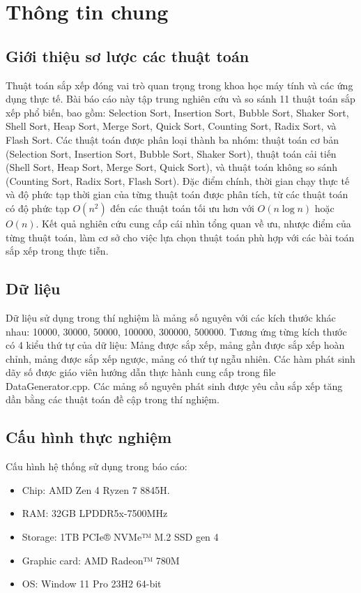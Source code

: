 \section{Thông tin chung}

\subsection{Giới thiệu sơ lược các thuật toán}

Thuật toán sắp xếp đóng vai trò quan trọng trong khoa học máy tính và các ứng dụng thực tế. Bài báo cáo này tập trung nghiên cứu và so sánh 11 thuật toán sắp xếp phổ biến, bao gồm: Selection Sort, Insertion Sort, Bubble Sort, Shaker Sort, Shell Sort, Heap Sort, Merge Sort, Quick Sort, Counting Sort, Radix Sort, và Flash Sort. Các thuật toán được phân loại thành ba nhóm: thuật toán cơ bản (Selection Sort, Insertion Sort, Bubble Sort, Shaker Sort), thuật toán cải tiến (Shell Sort, Heap Sort, Merge Sort, Quick Sort), và thuật toán không so sánh (Counting Sort, Radix Sort, Flash Sort). Đặc điểm chính, thời gian chạy thực tế và độ phức tạp thời gian của từng thuật toán được phân tích, từ các thuật toán có độ phức tạp $O(n^2)$ đến các thuật toán tối ưu hơn với $O(n \log n)$ hoặc $O(n)$. Kết quả nghiên cứu cung cấp cái nhìn tổng quan về ưu, nhược điểm của từng thuật toán, làm cơ sở cho việc lựa chọn thuật toán phù hợp với các bài toán sắp xếp trong thực tiễn.

\subsection{Dữ liệu}

Dữ liệu sử dụng trong thí nghiệm là mảng số nguyên với các kích thước khác nhau: 10000, 30000, 50000, 100000, 300000, 500000. Tương ứng từng kích thước có 4 kiểu thứ tự của dữ liệu: Mảng được sắp xếp, mảng gần được sắp xếp hoàn chỉnh, mảng được sắp xếp ngược, mảng có thứ tự ngẫu nhiên. Các hàm phát sinh dãy số được giáo viên hướng dẫn thực hành cung cấp trong file DataGenerator.cpp. Các mảng số nguyên phát sinh được yêu cầu sắp xếp tăng dần bằng các thuật toán đề cập trong thí nghiệm.

\subsection{Cấu hình thực nghiệm}
Cấu hình hệ thống sử dụng trong báo cáo:
\begin{itemize}
    \item Chip: AMD Zen 4 Ryzen 7 8845H.
    \item RAM: 32GB LPDDR5x-7500MHz
    \item Storage: 1TB PCIe® NVMe™ M.2 SSD gen 4
    \item Graphic card: AMD Radeon™ 780M
    \item OS: Window 11 Pro 23H2 64-bit
\end{itemize}
 

 
